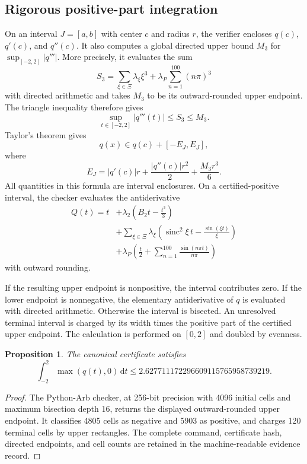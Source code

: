 \documentclass[11pt]{article}
\newtheorem{proposition}{Proposition}
\newcommand{\dd}{\,\mathrm{d}}
\DeclareMathOperator{\sinc}{sinc}
\begin{document}
\subsection{Rigorous positive-part integration}

On an interval $J=[a,b]$ with center $c$ and radius $r$, the verifier encloses
$q(c)$, $q'(c)$, and $q''(c)$. It also computes a global directed upper bound
$M_3$ for $\sup_{[-2,2]}|q'''|$. More precisely, it evaluates the sum
\[
  S_3=
  \sum_{\xi\in\Xi}\lambda_\xi\xi^3
  +\lambda_P\sum_{n=1}^{100}(n\pi)^3
\]
with directed arithmetic and takes \(M_3\) to be its outward-rounded upper
endpoint. The triangle inequality therefore gives
\[
  \sup_{t\in[-2,2]}|q'''(t)|\le S_3\le M_3.
\]
Taylor's theorem gives
\[
  q(x)\in q(c)+[-E_J,E_J],
\]
where
\[
  E_J=|q'(c)|r+\frac{|q''(c)|r^2}{2}+\frac{M_3r^3}{6}.
\]
All quantities in this formula are interval enclosures. On a
certified-positive interval, the checker evaluates the antiderivative
\begin{align*}
Q(t)=t
&+\lambda_2\left(B_2t-\frac{t^3}{3}\right)\\
&+\sum_{\xi\in\Xi}\lambda_\xi
  \left(\sinc^2\xi\,t-\frac{\sin(\xi t)}{\xi}\right)\\
&+\lambda_P\left(\frac t2+
  \sum_{n=1}^{100}\frac{\sin(n\pi t)}{n\pi}\right)
\end{align*}
with outward rounding.

If the resulting upper endpoint is nonpositive, the interval contributes
zero. If the lower endpoint is nonnegative, the elementary antiderivative of
$q$ is evaluated with directed arithmetic. Otherwise the interval is
bisected. An unresolved terminal interval is charged by its width times the
positive part of the certified upper endpoint. The calculation is performed
on $[0,2]$ and doubled by evenness.

\begin{proposition}\label{prop:center}
The canonical certificate satisfies
\[
  \int_{-2}^{2}\max(q(t),0)\dd t
  \le 2.627711172296609115765958739219.
\]
\end{proposition}

\begin{proof}
The Python-Arb checker, at 256-bit precision with 4096 initial cells and
maximum bisection depth 16, returns the displayed outward-rounded upper
endpoint. It classifies 4805 cells as negative and 5903 as positive, and
charges 120 terminal cells by upper rectangles. The complete command,
certificate hash, directed endpoints, and cell counts are retained in the
machine-readable evidence record.
\end{proof}
\end{document}
